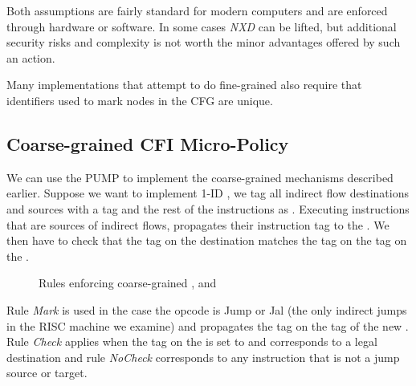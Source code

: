Both assumptions are fairly standard for modern computers and are enforced
through hardware or software. In some cases \emph{NXD} can be lifted, but
additional security risks and complexity is not worth the minor advantages
offered by such an action.

Many implementations that attempt to do fine-grained \CFI also require that
identifiers used to mark nodes in the CFG are unique.

\subsection{Coarse-grained CFI Micro-Policy}\label{sec:cfi_coarse}



We can use the PUMP to implement the coarse-grained \CFI mechanisms described
earlier. Suppose we want to implement 1-ID \CFI, we tag all indirect flow
destinations and sources with a tag \MARK{} and the rest of the instructions as
\UNMARK. Executing instructions that are sources of indirect flows, propagates
their instruction tag to the \pc. We then have to check that the tag on the
destination matches the tag on the tag on the \pc.

\begin{figure}[htb!]
\bigskip

\bigskip

\caption{Rules enforcing coarse-grained \CFI, \NXD and \NWC}
\end{figure}

Rule \emph{Mark} is used in the case the opcode is Jump or Jal (the
only indirect jumps in the RISC machine we examine) and propagates the
\MARKname tag on the tag of the new \pc. Rule \emph{Check} applies
when the tag on the \pc is set to \MARKname and corresponds to a legal
destination and rule \emph{NoCheck} corresponds to any instruction
that is not a jump source or target.

